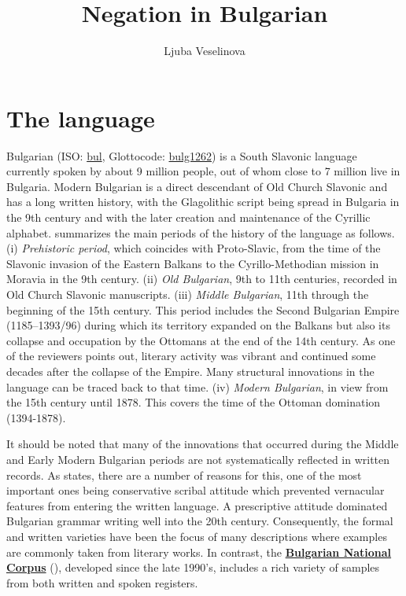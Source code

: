 \documentclass[output=paper,colorlinks=true, citecolor=brown]{langscibook}
\author{Ljuba Veselinova\affiliation{Stockholm University}}
\title{Negation in Bulgarian}
\begin{document}
\maketitle
\section{The language}
Bulgarian (ISO: \href{https://iso639-3.sil.org/code/bul}{bul}, Glottocode: \href{https://glottolog.org/resource/languoid/id/bulg1262}{bulg1262}) is a South Slavonic language currently spoken by about 9 million people, out of whom close to 7 million live in Bulgaria. Modern Bulgarian is a direct descendant of Old Church Slavonic and has a long written history, with the Glagolithic script being spread in Bulgaria in the 9th century and with the later creation and maintenance of the Cyrillic alphabet. \citet[188]{Scatton1993} summarizes the main periods of the history of the language as follows. (i) \textit{Prehistoric period}, which coincides with Proto-Slavic, from the time of the Slavonic invasion of the Eastern Balkans to the Cyrillo-Methodian mission in Moravia in the 9th century. (ii) \textit{Old Bulgarian}, 9th to 11th centuries, recorded in Old Church Slavonic manuscripts. (iii) \textit{Middle Bulgarian}, 11th through the beginning of the 15th century. This period includes the Second Bulgarian Empire (1185--1393/96) during which its territory expanded on the Balkans but also its collapse and  occupation by the Ottomans at the end of the 14th century. As one of the reviewers points out, literary activity was vibrant and continued some decades after the collapse of the Empire. Many structural innovations in the language can be traced back to that time. (iv) \textit{Modern Bulgarian}, in  view from the 15th century until 1878. This covers the time of the Ottoman domination (1394-1878). 

It should be  noted that many of the innovations that occurred during the Middle and Early Modern Bulgarian periods are not systematically reflected in written records. As \citet[188]{Scatton1993} states, there are a number of reasons for this, one of the most important ones being conservative scribal attitude which prevented vernacular features from entering the written language. A prescriptive attitude dominated Bulgarian grammar writing well into the 20th century. Consequently, the formal and written varieties have been the focus of many descriptions where examples are commonly taken from literary works. In contrast, the \textbf{\href{https://dcl.bas.bg/bulnc/}{Bulgarian National Corpus}} (\citealt{BNC2023}), developed since the late 1990's, includes a rich variety of samples from both written and spoken registers. 
\end{document}
